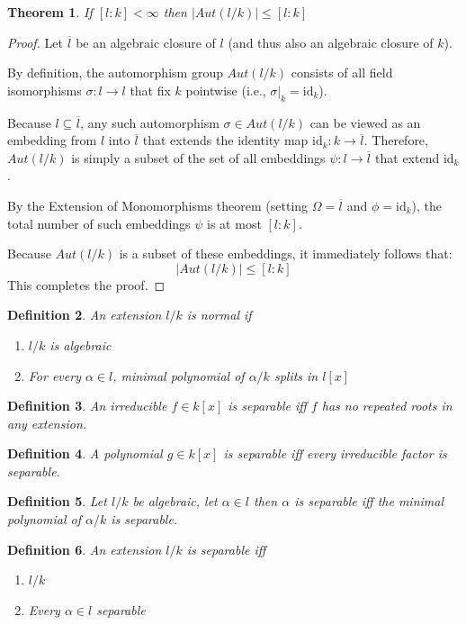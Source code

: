 \documentclass[a4paper,12pt]{article}
\newtheorem{thm}{Theorem}[section]
\newtheorem{defn}[thm]{Definition}
\begin{document}
\begin{thm}
    If $[l:k]<\infty$ then $|Aut(l/k)|\leq [l:k]$
\end{thm}

\begin{proof}
    Let $\overline{l}$ be an algebraic closure of $l$ (and thus also an algebraic closure of $k$).

    By definition, the automorphism group $Aut(l/k)$ consists of all field isomorphisms $\sigma: l \to l$ that fix $k$ pointwise (i.e., $\sigma|_k = \text{id}_k$).

    Because $l \subseteq \overline{l}$, any such automorphism $\sigma \in Aut(l/k)$ can be viewed as an embedding from $l$ into $\overline{l}$ that extends the identity map $\text{id}_k: k \to \overline{l}$. Therefore, $Aut(l/k)$ is simply a subset of the set of all embeddings $\psi: l \to \overline{l}$ that extend $\text{id}_k$.

    By the Extension of Monomorphisms theorem (setting $\Omega = \overline{l}$ and $\phi = \text{id}_k$), the total number of such embeddings $\psi$ is at most $[l:k]$.

    Because $Aut(l/k)$ is a subset of these embeddings, it immediately follows that:
    $$|Aut(l/k)| \leq [l:k]$$
    This completes the proof.
\end{proof}
\begin{defn}
    An extension $l/k$ is normal if 
    \begin{enumerate}
        \item $l/k$ is algebraic
        \item For every $\alpha\in l$, minimal polynomial of $\alpha/k$ splits in $l[x]$
    \end{enumerate}
\end{defn}
\begin{defn}
    An irreducible $f\in k[x]$ is separable iff $f$ has no repeated roots in any extension. 
\end{defn}
\begin{defn}
    A polynomial $g\in k[x]$ is separable iff every irreducible factor is separable. 
\end{defn}
\begin{defn}
    Let $l/k$ be algebraic, let $\alpha\in l$ then $\alpha$ is separable iff the minimal polynomial of $\alpha/k$ is separable. 
\end{defn}
\begin{defn}
    An extension $l/k$ is separable iff 
    \begin{enumerate}
        \item $l/k$
        \item Every $\alpha\in l$ separable
     \end{enumerate}
\end{defn}
\end{document}
